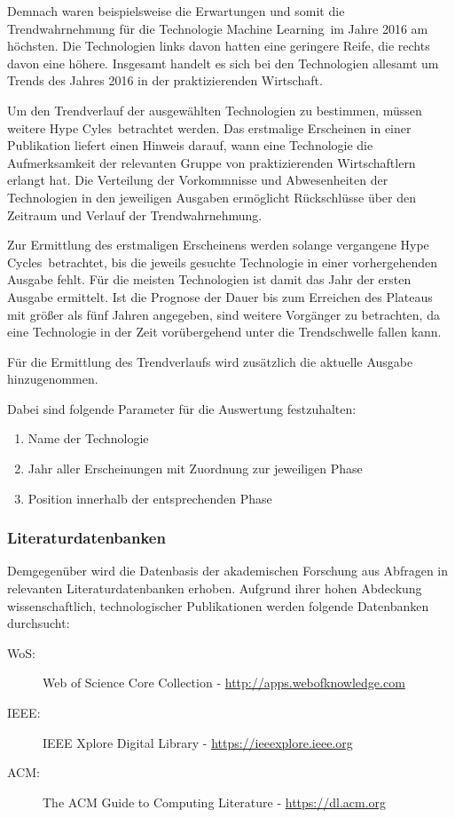 Demnach waren beispielsweise die Erwartungen und somit die Trendwahrnehmung für die Technologie \glqq Machine Learning\grqq~im Jahre 2016 am höchsten. Die Technologien links davon hatten eine geringere Reife, die rechts davon eine höhere. Insgesamt handelt es sich bei den Technologien allesamt um Trends des Jahres 2016 in der praktizierenden Wirtschaft.

Um den Trendverlauf der ausgewählten Technologien zu bestimmen, müssen weitere \glqq Hype Cyles\grqq~betrachtet werden. Das erstmalige Erscheinen in einer Publikation liefert einen Hinweis darauf, wann eine Technologie die Aufmerksamkeit der relevanten Gruppe von praktizierenden Wirtschaftlern erlangt hat. Die Verteilung der Vorkommnisse und Abwesenheiten der Technologien in den jeweiligen Ausgaben ermöglicht Rückschlüsse über den Zeitraum und Verlauf der Trendwahrnehmung.

Zur Ermittlung des erstmaligen Erscheinens werden solange vergangene \glqq Hype Cycles\grqq~betrachtet, bis die jeweils gesuchte Technologie in einer vorhergehenden Ausgabe fehlt. Für die meisten Technologien ist damit das Jahr der ersten Ausgabe ermittelt. Ist die Prognose der Dauer bis zum Erreichen des \glqq Plateaus\grqq~ mit größer als fünf Jahren angegeben, sind weitere Vorgänger zu betrachten, da eine Technologie in der Zeit vorübergehend unter die Trendschwelle fallen kann.

Für die Ermittlung des Trendverlaufs wird zusätzlich die aktuelle Ausgabe hinzugenommen.

Dabei sind folgende Parameter für die Auswertung festzuhalten:

\begin{enumerate}
	\item Name der Technologie
	\item Jahr aller Erscheinungen mit Zuordnung zur jeweiligen Phase
	\item Position innerhalb der entsprechenden Phase
\end{enumerate}

\subsubsection{Literaturdatenbanken}
Demgegenüber wird die Datenbasis der akademischen Forschung aus Abfragen in relevanten Literaturdatenbanken erhoben. Aufgrund ihrer hohen Abdeckung wissenschaftlich, technologischer Publikationen werden folgende Datenbanken durchsucht:
\begin{description}
	\item [WoS:] Web of Science Core Collection - \url{http://apps.webofknowledge.com}
	\item [IEEE:] IEEE Xplore Digital Library - \url{https://ieeexplore.ieee.org}
	\item [ACM:] The ACM Guide to Computing Literature - \url{https://dl.acm.org}
\end{description}

